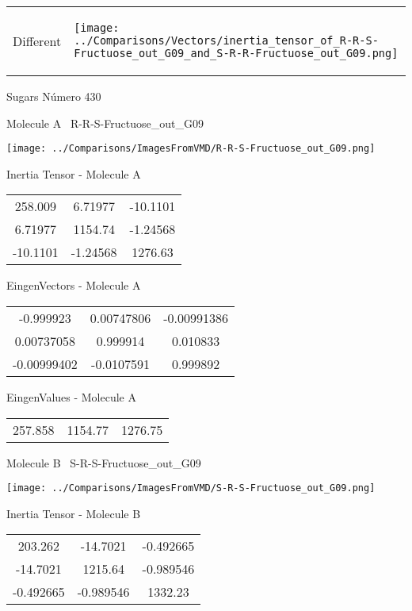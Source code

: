 \vtab[-5mm]
\begin{tabular}{*{2}{m{}}}
\begin{center}
\textcolor{NavyBlue}{\Large Different}
\end{center}
&
\begin{center}
\texttt{[image: ../Comparisons/Vectors/inertia\_tensor\_of\_R-R-S-Fructuose\_out\_G09\_and\_S-R-R-Fructuose\_out\_G09.png]}
\end{center}
\end{tabular}

 \newpage

\vtab[-3cm]
\begin{center}
{\large Sugars \tab Número 430}
\end{center}
\begin{multicols}{2}
\begin{center}

Molecule A \
R-R-S-Fructuose\_out\_G09

\texttt{[image: ../Comparisons/ImagesFromVMD/R-R-S-Fructuose\_out\_G09.png]}

Inertia Tensor - Molecule A \\
\begin{tabular}{|c c c|}
258.009	 & 	6.71977	 & 	-10.1101	 \\
6.71977	 & 	1154.74	 & 	-1.24568	 \\
-10.1101	 & 	-1.24568	 & 	1276.63
\end{tabular}

\vtab
 EingenVectors - Molecule A     \\
\begin{tabular}{|c c c|}
-0.999923	 & 	0.00747806	 & 	-0.00991386	 \\
0.00737058	 & 	0.999914	 & 	0.010833	 \\
-0.00999402	 & 	-0.0107591	 & 	0.999892
\end{tabular}

\vtab
 EingenValues - Molecule A     \\
\begin{tabular}{|c c c|}
257.858	 & 	1154.77	 & 	1276.75	 \\
\end{tabular}
\columnbreak

Molecule B \
S-R-S-Fructuose\_out\_G09

\texttt{[image: ../Comparisons/ImagesFromVMD/S-R-S-Fructuose\_out\_G09.png]}

Inertia Tensor - Molecule B \\
\begin{tabular}{|c c c|}
203.262	 & 	-14.7021	 & 	-0.492665	 \\
-14.7021	 & 	1215.64	 & 	-0.989546	 \\
-0.492665	 & 	-0.989546	 & 	1332.23
\end{tabular}


\end{center}
\end{multicols}
